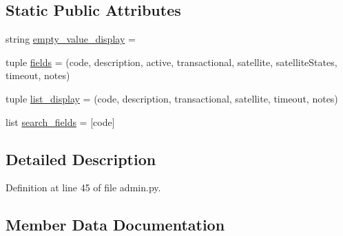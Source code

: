 \subsection*{Static Public Attributes}
\begin{DoxyCompactItemize}
\item 
string \hyperlink{class_ground_segment_1_1admin_1_1_command_type_admin_a33d28f3ea0909e227e12b323b479cd4b}{empty\+\_\+value\+\_\+display} = \textquotesingle{}\textquotesingle{}
\item 
tuple \hyperlink{class_ground_segment_1_1admin_1_1_command_type_admin_a1ee0f5d0adfcd6a4daab57e600d1e6e0}{fields} = (\textquotesingle{}code\textquotesingle{}, \textquotesingle{}description\textquotesingle{}, \textquotesingle{}active\textquotesingle{}, \textquotesingle{}transactional\textquotesingle{}, \textquotesingle{}satellite\textquotesingle{}, \textquotesingle{}satellite\+States\textquotesingle{}, \textquotesingle{}timeout\textquotesingle{}, \textquotesingle{}notes\textquotesingle{})
\item 
tuple \hyperlink{class_ground_segment_1_1admin_1_1_command_type_admin_a5afd80db575f5f9696c042e09a22966d}{list\+\_\+display} = (\textquotesingle{}code\textquotesingle{}, \textquotesingle{}description\textquotesingle{}, \textquotesingle{}transactional\textquotesingle{}, \textquotesingle{}satellite\textquotesingle{}, \textquotesingle{}timeout\textquotesingle{}, \textquotesingle{}notes\textquotesingle{})
\item 
list \hyperlink{class_ground_segment_1_1admin_1_1_command_type_admin_a3a3f190f65a4c32395397c193a0b86e5}{search\+\_\+fields} = \mbox{[}\textquotesingle{}code\textquotesingle{}\mbox{]}
\end{DoxyCompactItemize}


\subsection{Detailed Description}


Definition at line 45 of file admin.\+py.



\subsection{Member Data Documentation}
\hypertarget{class_ground_segment_1_1admin_1_1_command_type_admin_a33d28f3ea0909e227e12b323b479cd4b}{}
